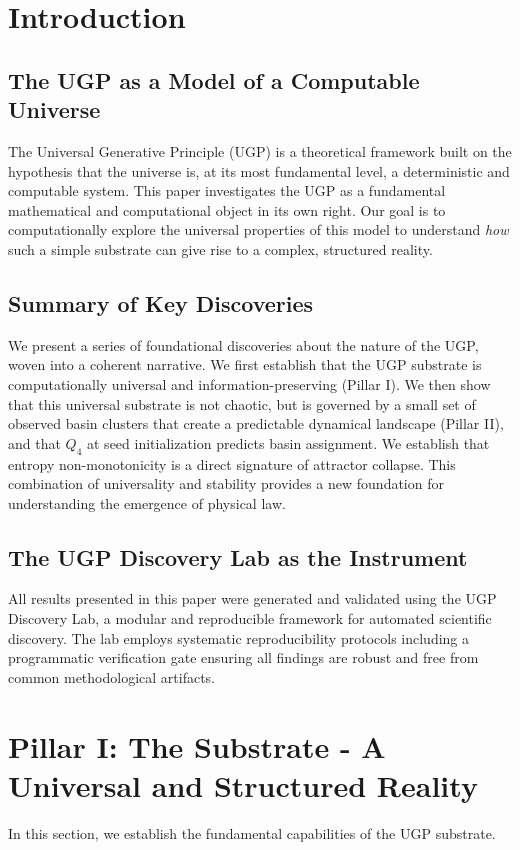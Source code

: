\documentclass[11pt]{article}
\begin{document}
\tableofcontents

\section{Introduction}

\subsection{The UGP as a Model of a Computable Universe}
The Universal Generative Principle (UGP) is a theoretical framework built on the hypothesis that the universe is, at its most fundamental level, a deterministic and computable system. This paper investigates the UGP as a fundamental mathematical and computational object in its own right. Our goal is to computationally explore the universal properties of this model to understand \textit{how} such a simple substrate can give rise to a complex, structured reality.

\subsection{Summary of Key Discoveries}
We present a series of foundational discoveries about the nature of the UGP, woven into a coherent narrative. We first establish that the UGP substrate is computationally universal and information-preserving (Pillar I). We then show that this universal substrate is not chaotic, but is governed by a small set of observed basin clusters that create a predictable dynamical landscape (Pillar II), and that $Q_4$ at seed initialization predicts basin assignment. We establish that entropy non-monotonicity is a direct signature of attractor collapse. This combination of universality and stability provides a new foundation for understanding the emergence of physical law.

\subsection{The UGP Discovery Lab as the Instrument}
All results presented in this paper were generated and validated using the UGP Discovery Lab, a modular and reproducible framework for automated scientific discovery. The lab employs systematic reproducibility protocols including a programmatic verification gate ensuring all findings are robust and free from common methodological artifacts.

\section{Pillar I: The Substrate - A Universal and Structured Reality}
\label{sec:pillar_one}
In this section, we establish the fundamental capabilities of the UGP substrate.
\end{document}

